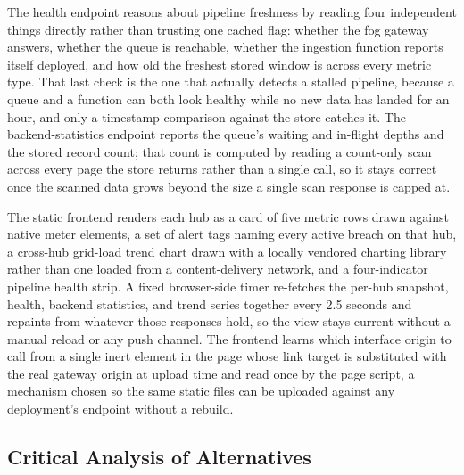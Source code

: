 \documentclass[conference]{IEEEtran}
\begin{document}
The health endpoint reasons about pipeline freshness by reading four independent things directly rather than trusting one cached flag: whether the fog gateway answers, whether the queue is reachable, whether the ingestion function reports itself deployed, and how old the freshest stored window is across every metric type. That last check is the one that actually detects a stalled pipeline, because a queue and a function can both look healthy while no new data has landed for an hour, and only a timestamp comparison against the store catches it. The backend-statistics endpoint reports the queue's waiting and in-flight depths and the stored record count; that count is computed by reading a count-only scan across every page the store returns rather than a single call, so it stays correct once the scanned data grows beyond the size a single scan response is capped at.

The static frontend renders each hub as a card of five metric rows drawn against native meter elements, a set of alert tags naming every active breach on that hub, a cross-hub grid-load trend chart drawn with a locally vendored charting library rather than one loaded from a content-delivery network, and a four-indicator pipeline health strip. A fixed browser-side timer re-fetches the per-hub snapshot, health, backend statistics, and trend series together every 2.5 seconds and repaints from whatever those responses hold, so the view stays current without a manual reload or any push channel. The frontend learns which interface origin to call from a single inert element in the page whose link target is substituted with the real gateway origin at upload time and read once by the page script, a mechanism chosen so the same static files can be uploaded against any deployment's endpoint without a rebuild.

\subsection{Critical Analysis of Alternatives}
\end{document}

